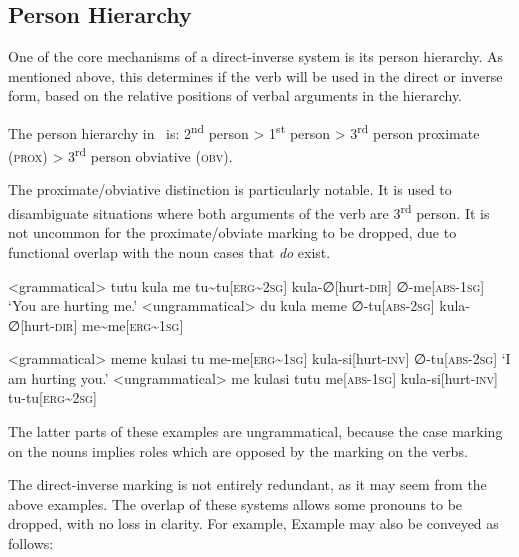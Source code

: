 \subsection{Person Hierarchy}\label{sec:person_hierarchy}
One of the core mechanisms of a direct-inverse system is its person hierarchy.
As mentioned above, this determines if the verb will be used in the direct or inverse form, based on the relative positions of verbal arguments in the hierarchy.

The person hierarchy in \langname\ is: 2\textsuperscript{nd} person > 1\textsuperscript{st} person > 3\textsuperscript{rd} person proximate (\textsc{prox}) > 3\textsuperscript{rd} person obviative (\textsc{obv}).

The proximate/obviative distinction is particularly notable.
It is used to disambiguate situations where both arguments of the verb are 3\textsuperscript{rd} person.
It is not uncommon for the proximate/obviate marking to be dropped, due to functional overlap with the noun cases that \textit{do} exist.

\begin{paracol}{2}
\a<grammatical>
\begingl
\glpreamble tutu kula me
\endpreamble
tu\textasciitilde tu[\textsc{erg\textasciitilde 2sg}]
kula-∅[hurt-\textsc{dir}]
∅-me[\textsc{abs-1sg}]
\glft `You are hurting me.'
\endgl
\switchcolumn
\a<ungrammatical>
\begingl
\glpreamble \ljudge{*} du kula meme
\endpreamble
∅-tu[\textsc{abs-2sg}]
kula-∅[hurt-\textsc{dir}]
me\textasciitilde me[\textsc{erg\textasciitilde 1sg}]
\endgl
\end{paracol}
\xe

\begin{paracol}{2}
\a<grammatical>
\begingl
\glpreamble meme kulasi tu
\endpreamble
me-me[\textsc{erg\textasciitilde 1sg}]
kula-si[hurt-\textsc{inv}]
∅-tu[\textsc{abs-2sg}]
\glft `I am hurting you.'
\endgl
\switchcolumn
\a<ungrammatical>
\begingl
\glpreamble \ljudge{*} me kulasi tutu
\endpreamble
me[\textsc{abs-1sg}]
kula-si[hurt-\textsc{inv}]
tu-tu[\textsc{erg\textasciitilde 2sg}]
\endgl
\end{paracol}
\xe

The latter parts of these examples are ungrammatical, because the case marking on the nouns implies roles which are opposed by the marking on the verbs.

The direct-inverse marking is not entirely redundant, as it may seem from the above examples.
The overlap of these systems allows some pronouns to be dropped, with no loss in clarity.
For example, Example  may also be conveyed as follows:

